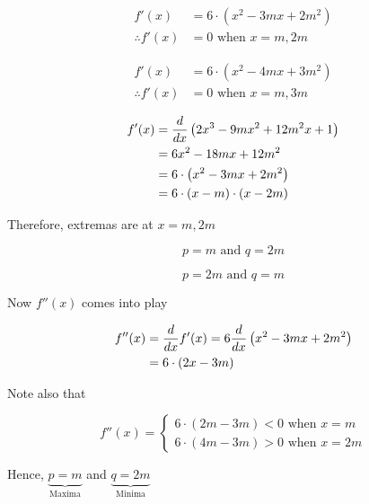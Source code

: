 \documentclass[14pt,fleqn]{extarticle}
\newcommand\fx{2x^3 - 9mx^2 + 12m^2 x + 1}
\begin{document}
\begin{problem}
\begin{step}
  \begin{options} 
     \correct 
       
       \begin{align}
	f'(x) &= 6\cdot \left(x^2 - 3mx + 2m^2 \right) \\
	\therefore f'(x) &= 0 \text{ when } x = m, 2m 
\end{align}
     \incorrect
        
        \begin{align}
	f'(x) &= 6\cdot \left(x^2 - 4mx + 3m^2 \right) \\
	\therefore f'(x) &= 0 \text{ when } x = m, 3m 
\end{align}
    \end{options} 
     \reason 
       
       \begin{align}
	f'(x) &= \ddx \left(\fx \right) \\
	&= 6x^2 - 18mx + 12m^2 \\ 
	&= 6\cdot \left(x^2 - 3mx + 2m^2 \right) \\
	&= 6\cdot \left(x-m \right)\cdot \left(x-2m \right)
\end{align}

Therefore, extremas are at $x = m, 2m$
\end{step}

\begin{step}
  \begin{options} 
     \correct 
       
       \[ p = m\text{ and } q = 2m \]
     \incorrect
        
        \[ p = 2m\text{ and } q = m \]
    \end{options} 
     \reason 
       
       Now $f''(x)$ comes into play 
       
       \begin{align}
		f''(x) &= \frac{d}{dx} f'(x) = 6 \frac{d}{dx} \left(x^2 - 3mx + 2m^2 \right) \\
		&= 6\cdot \left(2x - 3m \right)
\end{align}

Note also that 

\[ f''(x) = \begin{cases} 
6\cdot (2m-3m) < 0 \text{ when } x = m \\
6\cdot (4m - 3m) > 0\text{ when } x = 2m 
\end{cases} \]

Hence, $\underbrace{p = m}_{\text{Maxima}}$ and $\underbrace{q = 2m}_{\text{Minima}}$ 
\end{step}


\end{problem}
\end{document}
